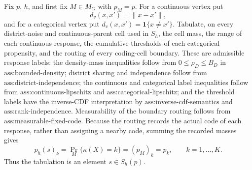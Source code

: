 Fix \(p\), \(h\), and first fix \(M\in M_G\) with \(p_M=p\).  For a continuous vertex put
\[
d_v(x,x')=\lVert x-x'\rVert,
\]
and for a categorical vertex put \(d_v(x,x')=\mathbf 1\{x\ne x'\}\).  Tabulate, on every district-noise and continuous-parent cell used in \(S_h\), the cell mass, the range of each continuous response, the cumulative thresholds of each categorical propensity, and the routing of every coding-cell boundary.  These are admissible response labels: the density-mass inequalities follow from \(0\leq\rho_D\leq B_D\) in \(\text{ass:bounded-density}\); district sharing and independence follow from \(\text{ass:district-independence}\); the continuous and categorical label inequalities follow from \(\text{ass:continuous-lipschitz}\) and \(\text{ass:categorical-lipschitz}\); and the threshold labels have the inverse-CDF interpretation by \(\text{ass:inverse-cdf-semantics}\) and \(\text{ass:rank-independence}\).  Measurability of the boundary routing follows from \(\text{ass:measurable-fixed-code}\).  Because the routing records the actual code of each response, rather than assigning a nearby code, summing the recorded masses gives
\[
p_h(s)_k=\Pr_M\{\kappa(X)=k\}=(p_M)_k=p_k,
\qquad k=1,\ldots,K.                                            \tag{1}
\]
Thus the tabulation is an element \(s\in S_h(p)\).

